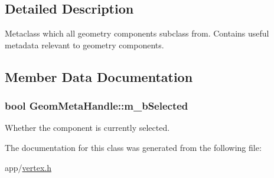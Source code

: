 \subsection{Detailed Description}
Metaclass which all geometry components subclass from. Contains useful metadata relevant to geometry components. 

\subsection{Member Data Documentation}
\hypertarget{class_geom_meta_handle_a545e915bdbffcafcf5cd9381b404874c}{
\subsubsection[{m\-\_\-b\-Selected}]{\setlength{\rightskip}{0pt plus 5cm}bool Geom\-Meta\-Handle\-::m\-\_\-b\-Selected}}\label{class_geom_meta_handle_a545e915bdbffcafcf5cd9381b404874c}
Whether the component is currently selected. 

The documentation for this class was generated from the following file\-:\begin{DoxyCompactItemize}
\item 
app/\hyperlink{vertex_8h}{vertex.\-h}\end{DoxyCompactItemize}
